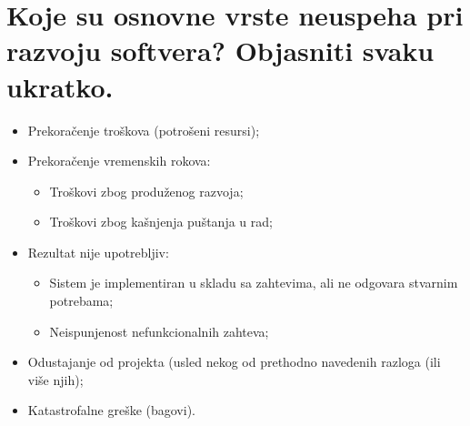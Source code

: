 \documentclass[a4paper]{article}
\begin{document}
\section{Koje su osnovne vrste neuspeha pri razvoju softvera? Objasniti svaku ukratko.}
  \begin{itemize}
    \item Prekoračenje troškova (potrošeni resursi);
    \item Prekoračenje vremenskih rokova:
          \begin{itemize}
            \item Troškovi zbog produženog razvoja;
            \item Troškovi zbog kašnjenja puštanja u rad;
          \end{itemize}
    \item Rezultat nije upotrebljiv:
          \begin{itemize}
            \item Sistem je implementiran u skladu sa zahtevima, ali ne odgovara stvarnim potrebama;
            \item Neispunjenost nefunkcionalnih zahteva;
          \end{itemize}
    \item Odustajanje od projekta (usled nekog od prethodno navedenih razloga (ili više njih);
    \item Katastrofalne greške (bagovi).
  \end{itemize}
\end{document}
